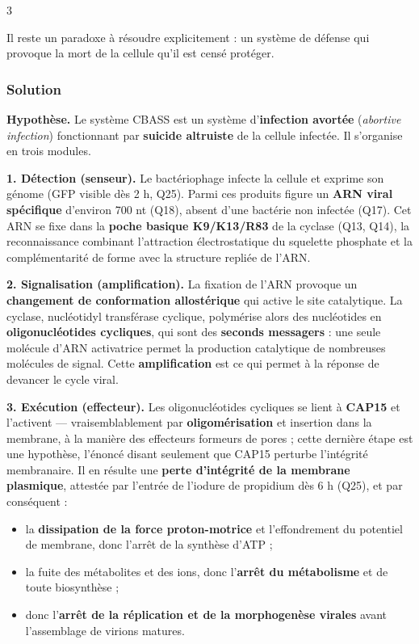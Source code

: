 \documentclass[11pt,a4paper]{article}
\providecommand{\tightlist}{\setlength{\itemsep}{0pt}\setlength{\parskip}{0pt}}
\begin{document}
\begin{indication}{3}

Il reste un paradoxe à résoudre explicitement : un système de défense qui provoque la mort de la cellule qu'il est censé protéger.

\end{indication}

\hypertarget{solution-25}{%
\subsubsection{Solution}\label{solution-25}}

\textbf{Hypothèse.} Le système CBASS est un système d'\textbf{infection avortée} (\emph{abortive infection}) fonctionnant par \textbf{suicide altruiste} de la cellule infectée. Il s'organise en trois modules.

\textbf{1. Détection (senseur).} Le bactériophage infecte la cellule et exprime son génome (GFP visible dès 2 h, Q25). Parmi ces produits figure un \textbf{ARN viral spécifique} d'environ 700 nt (Q18), absent d'une bactérie non infectée (Q17). Cet ARN se fixe dans la \textbf{poche basique K9/K13/R83} de la cyclase (Q13, Q14), la reconnaissance combinant l'attraction électrostatique du squelette phosphate et la complémentarité de forme avec la structure repliée de l'ARN.

\textbf{2. Signalisation (amplification).} La fixation de l'ARN provoque un \textbf{changement de conformation allostérique} qui active le site catalytique. La cyclase, nucléotidyl transférase cyclique, polymérise alors des nucléotides en \textbf{oligonucléotides cycliques}, qui sont des \textbf{seconds messagers} : une seule molécule d'ARN activatrice permet la production catalytique de nombreuses molécules de signal. Cette \textbf{amplification} est ce qui permet à la réponse de devancer le cycle viral.

\textbf{3. Exécution (effecteur).} Les oligonucléotides cycliques se lient à \textbf{CAP15} et l'activent --- vraisemblablement par \textbf{oligomérisation} et insertion dans la membrane, à la manière des effecteurs formeurs de pores ; cette dernière étape est une hypothèse, l'énoncé disant seulement que CAP15 perturbe l'intégrité membranaire. Il en résulte une \textbf{perte d'intégrité de la membrane plasmique}, attestée par l'entrée de l'iodure de propidium dès 6 h (Q25), et par conséquent :

\begin{itemize}
\tightlist
\item
  la \textbf{dissipation de la force proton-motrice} et l'effondrement du potentiel de membrane, donc l'arrêt de la synthèse d'ATP ;
\item
  la fuite des métabolites et des ions, donc l'\textbf{arrêt du métabolisme} et de toute biosynthèse ;
\item
  donc l'\textbf{arrêt de la réplication et de la morphogenèse virales} avant l'assemblage de virions matures.
\end{itemize}
\end{document}
